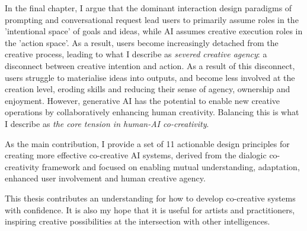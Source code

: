 In the final chapter, I argue that the dominant interaction design paradigms of prompting and conversational request lead users to primarily assume roles in the 'intentional space' of goals and ideas, while AI assumes creative execution roles in the 'action space'. As a result, users become increasingly detached from the creative process, leading to what I describe as \textit{severed creative agency}: a disconnect between creative intention and action. As a result of this disconnect, users struggle to materialise ideas into outputs, and become less involved at the creation level, eroding skills and reducing their sense of agency, ownership and enjoyment. However, generative AI has the potential to enable new creative operations by collaboratively enhancing human creativity. Balancing this is what I describe as \textit{the core tension in human-AI co-creativity}.

As the main contribution, I provide a set of 11 actionable design principles for creating more effective co-creative AI systems, derived from the dialogic co-creativity framework and focused on enabling mutual understanding, adaptation, enhanced user involvement and human creative agency. 

This thesis contributes an understanding for how to develop co-creative systems with confidence. It is also my hope that it is useful for artists and practitioners, inspiring creative possibilities at the intersection with other intelligences.